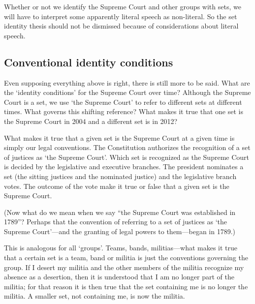 \documentclass[11pt]{article}
\begin{document}
\begin{spacing}{1.5}
Whether or not we identify the Supreme Court and other groups with
sets, we will have to interpret some apparently literal speech as
non-literal.  So the set identity thesis should not be dismissed
because of considerations about literal speech.


\subsection{Conventional identity conditions}
\label{set-convention}
Even supposing everything above is right, there is still more to be
said.  What are the `identity conditions' for the Supreme Court over
time?  Although the Supreme Court is a set, we use `the Supreme Court'
to refer to different sets at different times.  What governs this
shifting reference?  What makes it true that one set is the Supreme
Court in 2004 and a different set is in 2012?

What makes it true that a given set is the Supreme Court at a given
time is simply our legal conventions.  The Constitution authorizes the
recognition of a set of justices as `the Supreme Court'.  Which set is
recognized as the Supreme Court is decided by the legislative and
executive branches.  The president nominates a set (the sitting
justices and the nominated justice) and the legislative branch votes.
The outcome of the vote make it true or false that a given set is the
Supreme Court.

(Now what do we mean when we say ``the Supreme Court was established
in 1789''?  Perhaps that the convention of referring to a set of
justices as `the Supreme Court'---and the granting of legal powers to
them---began in 1789.)

This is analogous for all `groups'.  Teams, bands, militias---what
makes it true that a certain set is a team, band or militia is just
the conventions governing the group.  If I desert my militia and the
other members of the militia recognize my absence as a desertion, then
it is understood that I am no longer part of the militia; for that
reason it is then true that the set containing me is no longer the
militia.  A smaller set, not containing me, is now the militia.


\end{spacing}
\end{document}
